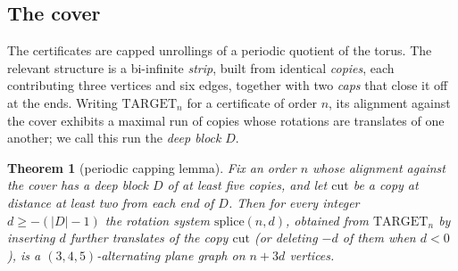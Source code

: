 \documentclass[11pt,a4paper]{amsart}
\theoremstyle{plain}
\newtheorem{theorem}{Theorem}[section]
\theoremstyle{definition}
\begin{document}
\subsection{The cover}

The certificates are capped unrollings of a periodic quotient of the torus. The
relevant structure is a bi-infinite \emph{strip}, built from identical
\emph{copies}, each contributing three vertices and six edges, together with two
\emph{caps} that close it off at the ends. Writing $\mathrm{TARGET}_n$ for a
certificate of order $n$, its alignment against the cover exhibits a maximal run
of copies whose rotations are translates of one another; we call this run the
\emph{deep block} $D$.

\begin{theorem}[periodic capping lemma]\label{thm:pumping}
Fix an order $n$ whose alignment against the cover has a deep block $D$ of at
least five copies, and let $\mathrm{cut}$ be a copy at distance at least two
from each end of $D$. Then for every integer $d \ge -(|D| - 1)$ the rotation
system $\mathrm{splice}(n,d)$, obtained from $\mathrm{TARGET}_n$ by inserting
$d$ further translates of the copy $\mathrm{cut}$ (or deleting $-d$ of them when
$d < 0$), is a $(3,4,5)$-alternating plane graph on $n + 3d$ vertices.
\end{theorem}
\end{document}
